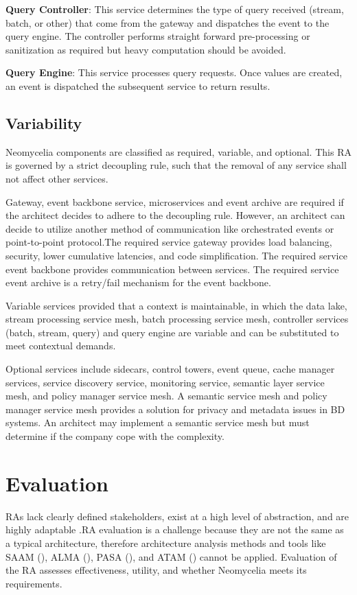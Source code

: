 \documentclass[runningheads]{llncs}
\begin{document}
\textbf{Query Controller}: This service determines the type of query received (stream, batch, or other) that come from the gateway and dispatches the event to the query engine. The controller performs straight forward pre-processing or sanitization as required but heavy computation should be avoided.

\textbf{Query Engine}: This service processes query requests. Once values are created, an event is dispatched the subsequent service to return results.

\subsection{Variability}
Neomycelia components are classified as required, variable, and optional. This RA is governed by a strict decoupling rule, such that the removal of any service shall not affect other services.

Gateway, event backbone service, microservices and event archive are required if the architect decides to adhere to the decoupling rule. However, an architect can decide to utilize another method of communication like orchestrated events or point-to-point protocol.The required service gateway provides load balancing, security, lower cumulative latencies, and code simplification. The required service event backbone provides communication between services. The required service event archive is a retry/fail mechanism for the event backbone.

Variable services provided that  a context is maintainable, in which the data lake, stream processing service mesh, batch processing service mesh, controller services (batch, stream, query) and query engine are variable and can be substituted to meet contextual demands.

Optional services include sidecars, control towers, event queue, cache manager services, service discovery service, monitoring service, semantic layer service mesh, and policy manager service mesh. A semantic service mesh and policy manager service mesh provides a solution for privacy and metadata issues in BD systems. An architect may implement a semantic service mesh but must determine if the company cope with the complexity.

\section{Evaluation}

RAs lack clearly defined stakeholders, exist at a high level of abstraction, and are highly adaptable \cite{AtaeiACIS}.RA evaluation is a challenge \cite{angelov2008contracting,Avgeriou,Cioroaica,Maier} because they are not the same as a typical architecture, therefore architecture analysis methods and tools like SAAM (\cite{KazmanSASM}), ALMA (\cite{Bengtsson}), PASA (\cite{Williams}), and ATAM (\cite{KazmanATAM}) cannot be applied. Evaluation of the RA assesses effectiveness, utility, and whether Neomycelia meets its requirements.
\end{document}
